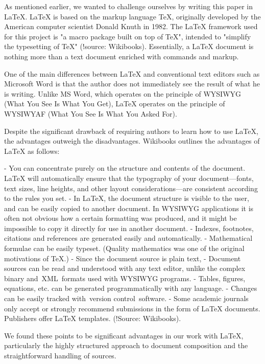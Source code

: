 As mentioned earlier, we wanted to challenge ourselves by writing this paper in \LaTeX{}. \LaTeX{} is based on the markup language TeX, originally developed by the American computer scientist Donald Knuth in 1982. The \LaTeX{} framework used for this project is "a macro package built on top of TeX", intended to "simplify the typesetting of TeX" (!source: Wikibooks). Essentially, a \LaTeX{} document is nothing more than a text document enriched with commands and markup.

One of the main differences between \LaTeX{} and conventional text editors such as Microsoft Word is that the author does not immediately see the result of what he is writing. Unlike MS Word, which operates on the principle of WYSIWYG (What You See Is What You Get), \LaTeX{} operates on the principle of WYSIWYAF (What You See Is What You Asked For).

Despite the significant drawback of requiring authors to learn how to use \LaTeX{}, the advantages outweigh the disadvantages. Wikibooks outlines the advantages of \LaTeX{} as follows:

- You can concentrate purely on the structure and contents of the document. \LaTeX{} will automatically ensure that the typography of your document—fonts, text sizes, line heights, and other layout considerations—are consistent according to the rules you set.
- In \LaTeX{}, the document structure is visible to the user, and can be easily copied to another document. In WYSIWYG applications it is often not obvious how a certain formatting was produced, and it might be impossible to copy it directly for use in another document.
- Indexes, footnotes, citations and references are generated easily and automatically.
- Mathematical formulae can be easily typeset. (Quality mathematics was one of the original motivations of TeX.)
- Since the document source is plain text,
    - Document sources can be read and understood with any text editor, unlike the complex binary and XML formats used with WYSIWYG programs.
    - Tables, figures, equations, etc. can be generated programmatically with any language.
    - Changes can be easily tracked with version control software.
- Some academic journals only accept or strongly recommend submissions in the form of \LaTeX{} documents. Publishers offer \LaTeX{} templates.
(!Source: Wikibooks).

We found these points to be significant advantages in our work with \LaTeX{}, particularly the highly structured approach to document composition and the straightforward handling of sources.

